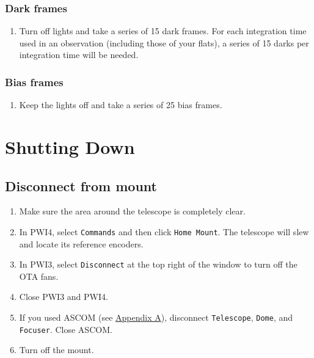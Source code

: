 \documentclass{article}
\begin{document}
	\subsubsection{Dark frames}
	\label{sec:dark-frames}
	
	\begin{enumerate}
		
		\item Turn off lights and take a series of 15 dark frames. For each integration time used in an observation (including those of your flats), a series of 15 darks per integration time will be needed.
		
	\end{enumerate}

	\subsubsection{Bias frames}
	\label{sec:bias-frames}
	
	\begin{enumerate}
		
		\item Keep the lights off and take a series of 25 bias frames.
		
	\end{enumerate}
	
	\newpage
	\section{Shutting Down}
	\label{sec:shutting-down}
	
	\subsection{Disconnect from mount}
	\label{sec:disconnect-from-mount}
	
	\begin{enumerate}
		
		\item Make sure the area around the telescope is completely clear.
		
		\item In PWI4, select \texttt{Commands} and then click \texttt{Home Mount}. The telescope will slew and locate its reference encoders.
		
		\item In PWI3, select \texttt{Disconnect} at the top right of the window to turn off the OTA fans.
		
		\item Close PWI3 and PWI4.
		
		\item If you used ASCOM (see \hyperref[sec:set-up-ascom]{Appendix A}), disconnect \texttt{Telescope}, \texttt{Dome}, and \texttt{Focuser}. Close ASCOM.
		
		\item Turn off the mount.
		
	\end{enumerate}
\end{document}

